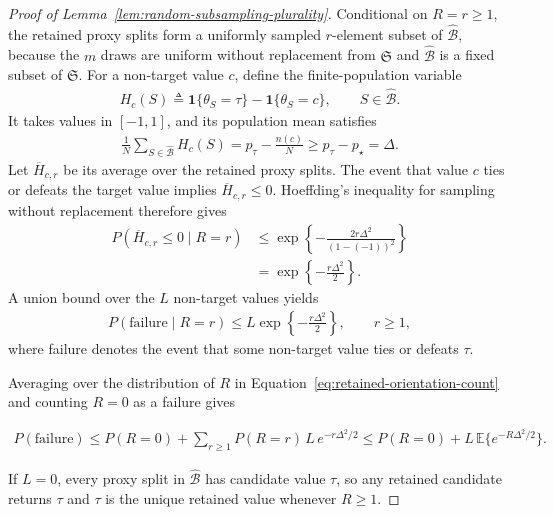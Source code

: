 \begin{proof}[ Proof of Lemma~\ref{lem:random-subsampling-plurality}]
 Conditional on $R=r\ge1$, the retained proxy splits form a uniformly sampled $r$-element subset of $\widehat{\mathcal B}$, because the $m$ draws are uniform without replacement from $\mathfrak S$ and $\widehat{\mathcal B}$ is a fixed subset of $\mathfrak S$. For a non-target value $c$, define the finite-population variable
\begin{align*}
H_c(S)
\triangleq
\mathbf 1\{\theta_S=\tau\}
-
\mathbf 1\{\theta_S=c\},
\qquad S\in\widehat{\mathcal B}.
\end{align*}
It takes values in $[-1,1]$, and its population mean satisfies
\begin{align*}
\frac{1}{N}\sum_{S\in\widehat{\mathcal B}}H_c(S)
=
p_\tau-\frac{n(c)}{N}
\ge
p_\tau-p_\star
=
\Delta.
\end{align*}
Let $\overline H_{c,r}$ be its average over the retained proxy splits. The event that value $c$ ties or defeats the target value implies $\overline H_{c,r}\le0$. Hoeffding's inequality for sampling without replacement \citep{hoeffding1963probability} therefore gives
\begin{align*}
P\!\left(
\overline H_{c,r}\le0
\mid R=r
\right)
&\le
\exp\left\{
-\frac{2r\Delta^2}{(1-(-1))^2}
\right\}\\
&=
\exp\left\{-\frac{r\Delta^2}{2}\right\}.
\end{align*}
 A union bound over the $L$ non-target values yields
\begin{align*}
P(\text{failure}\mid R=r)
\le
L\exp\left\{-\frac{r\Delta^2}{2}\right\},\qquad r\ge1,
\end{align*}
where failure denotes the event that some non-target value ties or defeats $\tau$.

Averaging over the distribution of $R$ in Equation~\eqref{eq:retained-orientation-count} and counting $R=0$ as a failure gives

\begin{align*}
P(\text{failure})
\le
P(R=0)+\sum_{r\ge1}P(R=r)\,L\,e^{-r\Delta^2/2}
\le
P(R=0)+L\,\mathbb E\bigl\{e^{-R\Delta^2/2}\bigr\}.
\end{align*}

 If $L=0$, every proxy split in $\widehat{\mathcal B}$ has candidate value $\tau$, so any retained candidate returns $\tau$ and $\tau$ is the unique retained value whenever $R\ge1$.
\end{proof}

